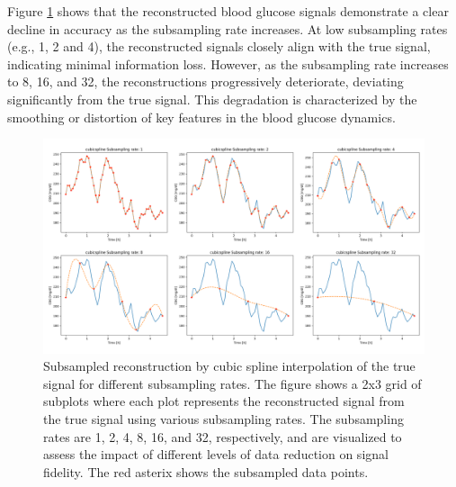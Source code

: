 Figure \ref{fig:SR_combined} shows that the reconstructed blood glucose signals demonstrate a clear decline in accuracy as the subsampling rate increases. At low subsampling rates (e.g., 1, 2 and 4), the reconstructed signals closely align with the true signal, indicating minimal information loss. However, as the subsampling rate increases to 8, 16, and 32, the reconstructions progressively deteriorate, deviating significantly from the true signal. This degradation is characterized by the smoothing or distortion of key features in the blood glucose dynamics.
\begin{figure}[p] %
	\centering
	\includegraphics[width=\textwidth]{Figures/SR_combined.png} %
	\caption{Subsampled reconstruction by cubic spline interpolation of the true signal for different subsampling rates. The figure shows a 2x3 grid of subplots where each plot represents the reconstructed signal from the true signal using various subsampling rates. The subsampling rates are 1, 2, 4, 8, 16, and 32, respectively, and are visualized to assess the impact of different levels of data reduction on signal fidelity. The red asterix shows the subsampled data points.}
	\label{fig:SR_combined}  %
\end{figure}

